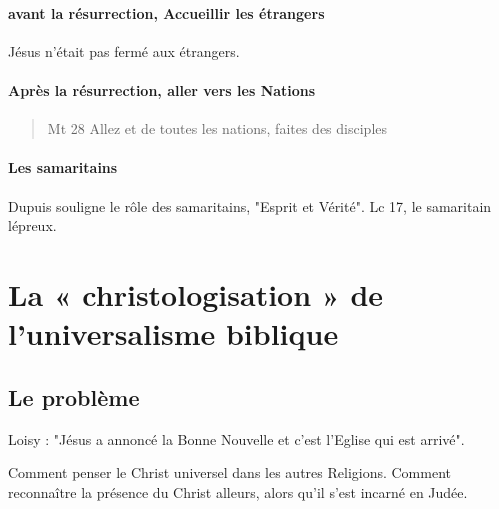\paragraph{avant la résurrection, Accueillir les étrangers} Jésus n'était pas fermé aux étrangers. 
\paragraph{Après la résurrection, aller vers les Nations} 
\begin{quote}
    Mt 28 Allez et de toutes les nations, faites des disciples
\end{quote}
 
  \paragraph{Les samaritains}
  
 Dupuis souligne le rôle des samaritains, "Esprit et Vérité". Lc 17, le samaritain lépreux. 
  

  \section{La « christologisation » de l'universalisme
  biblique} 



   
    
    \subsection{Le problème}
    
   Loisy  : "Jésus a annoncé la Bonne Nouvelle et c'est l'Eglise qui est arrivé".
   
   Comment penser le Christ universel dans les autres Religions. Comment reconnaître la présence du Christ alleurs, alors qu'il s'est incarné en Judée.
   
